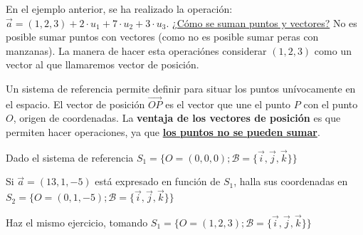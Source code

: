 \obs En el ejemplo anterior, se ha realizado la operación: $\vec{a} =  (1,2,3) + 2·u_1 + 7·u_2 + 3·u_3$. \ul{¿Cómo se suman puntos y vectores?} 
%
No es posible sumar puntos con vectores (como no es posible sumar peras con manzanas). La manera de hacer esta operaciónes considerar $(1,2,3)$ como un vector al que llamaremos vector de posición.


Un sistema de referencia permite definir  para situar los puntos unívocamente en el espacio.
%
El vector de posición $\vec{OP}$ es el vector que une el punto $P$ con el punto $O$, origen de coordenadas. 
%
La \textbf{ventaja de los vectores de posición} es que permiten hacer operaciones, ya que \ul{\textbf{los puntos no se pueden sumar}}.



\begin{problem}

Dado el sistema de referencia $S_1=\{O = (0,0,0); \mathcal{B} = \{\vec{i},\vec{j},\vec{k}\}\}$

\ppart Si $\vec{a} = (13,1,-5)$ está expresado en función de $S_1$, halla sus coordenadas en $S_2=\{O = (0,1,-5); \mathcal{B} = \{\vec{i},\vec{j},\vec{k}\}\}$

\ppart Haz el mismo ejercicio, tomando $S_1=\{O = (1,2,3); \mathcal{B} = \{\vec{i},\vec{j},\vec{k}\}\}$

\solution
{}


\end{problem}


